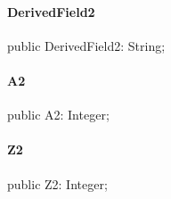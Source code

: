 \documentclass{report}
\begin{document}
\paragraph*{DerivedField2}\hspace*{\fill}

\begin{list}{}{
\setlength{\itemindent}{0cm}
\setlength{\listparindent}{0cm}
\setlength{\leftmargin}{\evensidemargin}
\addtolength{\leftmargin}{\tmplength}
\settowidth{\labelsep}{X}
\addtolength{\leftmargin}{\labelsep}
\setlength{\labelwidth}{\tmplength}
}
\begin{flushleft}
\item[\textbf{Declaration}\hfill]
\begin{ttfamily}
public DerivedField2: String;\end{ttfamily}


\end{flushleft}
\end{list}
\paragraph*{A2}\hspace*{\fill}

\begin{list}{}{
\setlength{\itemindent}{0cm}
\setlength{\listparindent}{0cm}
\setlength{\leftmargin}{\evensidemargin}
\addtolength{\leftmargin}{\tmplength}
\settowidth{\labelsep}{X}
\addtolength{\leftmargin}{\labelsep}
\setlength{\labelwidth}{\tmplength}
}
\begin{flushleft}
\item[\textbf{Declaration}\hfill]
\begin{ttfamily}
public A2: Integer;\end{ttfamily}


\end{flushleft}
\end{list}
\paragraph*{Z2}\hspace*{\fill}

\begin{list}{}{
\setlength{\itemindent}{0cm}
\setlength{\listparindent}{0cm}
\setlength{\leftmargin}{\evensidemargin}
\addtolength{\leftmargin}{\tmplength}
\settowidth{\labelsep}{X}
\addtolength{\leftmargin}{\labelsep}
\setlength{\labelwidth}{\tmplength}
}
\begin{flushleft}
\item[\textbf{Declaration}\hfill]
\begin{ttfamily}
public Z2: Integer;\end{ttfamily}


\end{flushleft}
\end{list}
\end{document}
